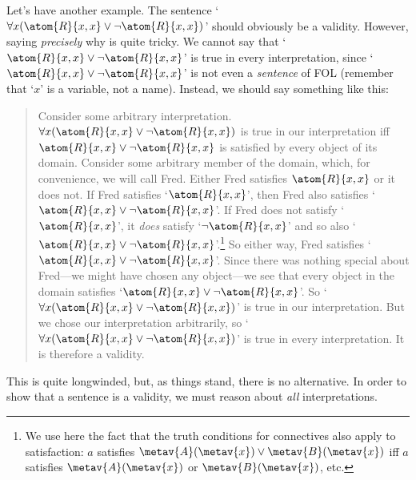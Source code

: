 Let's have another example. The sentence `$\forall x(\atom{R}{x,x}\eor\enot \atom{R}{x,x})$' should obviously be a validity. However, saying \emph{precisely} why is quite tricky. We cannot say that `$\atom{R}{x,x} \eor\enot \atom{R}{x,x}$' is true in every interpretation, since `$\atom{R}{x,x} \eor\enot \atom{R}{x,x}$' is not even a \emph{sentence} of FOL (remember that `$x$' is a variable, not a name). Instead, we should say something like this:
	\begin{quote}
		Consider some arbitrary interpretation. $\forall x(\atom{R}{x,x}\eor \enot\atom{R}{x,x})$ is true in our interpretation iff $\atom{R}{x,x}\eor\enot\atom{R}{x,x}$ is satisfied by every object of its domain. Consider some arbitrary member of the domain, which, for convenience, we will call Fred. Either Fred satisfies $\atom{R}{x,x}$ or it does not. If Fred satisfies `$\atom{R}{x,x}$', then Fred also satisfies `$\atom{R}{x,x} \eor \enot \atom{R}{x,x}$'. If Fred does not satisfy `$\atom{R}{x,x}$', it \emph{does} satisfy `$\enot\atom{R}{x,x}$' and so also `$\atom{R}{x,x} \eor\enot \atom{R}{x,x}$'.\footnote{We use here the fact that the truth conditions for connectives also apply to satisfaction: $a$ satisfies $\metav{A}(\metav{x}) \lor \metav{B}(\metav{x})$ iff $a$ satisfies $\metav{A}(\metav{x})$ or $\metav{B}(\metav{x})$, etc.} So either way, Fred satisfies `$\atom{R}{x,x} \eor\enot \atom{R}{x,x}$'. Since there was nothing special about Fred---we might have chosen any object---we see that every object in the domain satisfies `$\atom{R}{x,x} \eor\enot \atom{R}{x,x}$'. So `$\forall x (\atom{R}{x,x} \eor\enot \atom{R}{x,x})$' is true in our interpretation. But we chose our interpretation arbitrarily, so `$\forall x (\atom{R}{x,x} \eor\enot \atom{R}{x,x})$' is true in every interpretation. It is therefore a validity.
	\end{quote}
This is quite longwinded, but, as things stand, there is no alternative. In order to show that a sentence is a validity, we must reason about \emph{all} interpretations.

